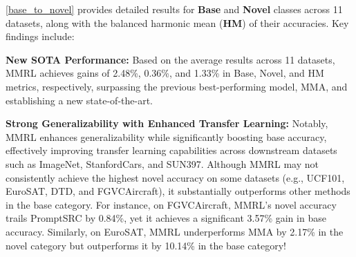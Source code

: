 \cref{base_to_novel} provides detailed results for \textbf{Base} and \textbf{Novel} classes across 11 datasets, along with the balanced harmonic mean (\textbf{HM}) of their accuracies. Key findings include:

\noindent \textbf{New SOTA Performance:} Based on the average results across 11 datasets, MMRL achieves gains of 2.48\%, 0.36\%, and 1.33\% in Base, Novel, and HM metrics, respectively, surpassing the previous best-performing model, MMA, and establishing a new state-of-the-art.

\noindent \textbf{Strong Generalizability with Enhanced Transfer Learning:} Notably, MMRL enhances generalizability while significantly boosting base accuracy, effectively improving transfer learning capabilities across downstream datasets such as ImageNet, StanfordCars, and SUN397. Although MMRL may not consistently achieve the highest novel accuracy on some datasets (e.g., UCF101, EuroSAT, DTD, and FGVCAircraft), it substantially outperforms other methods in the base category. For instance, on FGVCAircraft, MMRL’s novel accuracy trails PromptSRC by 0.84\%, yet it achieves a significant 3.57\% gain in base accuracy. Similarly, on EuroSAT, MMRL underperforms MMA by 2.17\% in the novel category but outperforms it by 10.14\% in the base category!


\begin{table}[t]
\centering
\setlength{\abovecaptionskip}{0.15cm}  
\caption{Comparison of MMRL with previous state-of-the-art methods on domain generalization across 4 datasets.}
\label{domain_generalization}
\vspace{-0.4cm}
\end{table}


